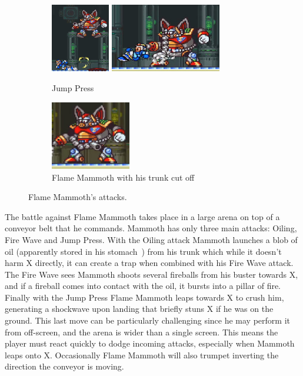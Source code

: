 \begin{figure}[htp]
	\begin{subfigure}{\textwidth}
		\centering
		\includegraphics[height=3cm]{figures/X1/Flame_mammoth/Mammoth_press_1.jpg}
		\includegraphics[height=3cm]{figures/X1/Flame_mammoth/Mammoth_press_2.jpg}
		\caption{Jump Press}
	\end{subfigure}
	\begin{subfigure}{0.3\textwidth}
		\centering
		\includegraphics[height=3cm]{figures/X1/Flame_mammoth/Mammoth_cut.jpg}
		\caption{Flame Mammoth with his trunk cut off}
	\end{subfigure}
	\caption{Flame Mammoth's attacks.}
\end{figure}
The battle against Flame Mammoth takes place in a large arena on top of a conveyor belt that he commands. Mammoth has only three main attacks: Oiling, Fire Wave and Jump Press. With the Oiling attack Mammoth launches a blob of oil (apparently stored in his stomach~\cite{wayback:X_resources}) from his trunk which while it doesn't harm X directly, it can create a trap when combined with his Fire Wave attack. The Fire Wave sees Mammoth shoots several fireballs from his buster towards X, and if a fireball comes into contact with the oil, it bursts into a pillar of fire. Finally with the Jump Press Flame Mammoth leaps towards X to crush him, generating a shockwave upon landing that briefly stuns X if he was on the ground. This last move can be particularly challenging since he may perform it from off-screen, and the arena is wider than a single screen. This means the player must react quickly to dodge incoming attacks, especially when Mammoth leaps onto X. Occasionally Flame Mammoth will also trumpet inverting the direction the conveyor is moving. 

